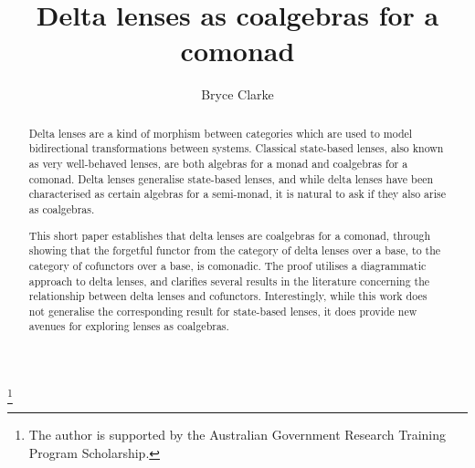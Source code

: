 \documentclass[colorlinks = true, a4paper, oneside, reqno, 11pt]{amsart}
\theoremstyle{definition}
\theoremstyle{remark}
\begin{document}
\title{Delta lenses as coalgebras for a comonad}

\author{Bryce Clarke}

\address{Centre of Australian Category Theory\\
Macquarie University, NSW 2109, Australia}


\thanks{The author is supported by the 
Australian Government Research Training Program Scholarship.}





\begin{abstract}
Delta lenses are a kind of morphism between categories which are 
used to model bidirectional transformations between systems. 
Classical state-based lenses, also known as very well-behaved lenses, 
are both algebras for a monad and coalgebras for a comonad. 
Delta lenses generalise state-based lenses, and while delta lenses 
have been characterised as certain algebras for a semi-monad, 
it is natural to ask if they also arise as coalgebras. 

This short paper establishes that delta lenses are coalgebras 
for a comonad, through showing that the forgetful functor 
from the category of delta lenses over a base, to the category 
of cofunctors over a base, is comonadic. 
The proof utilises a diagrammatic approach to delta lenses, 
and clarifies several results in the literature concerning the 
relationship between delta lenses and cofunctors. 
Interestingly, while this work does not generalise the 
corresponding result for state-based lenses, it does provide new 
avenues for exploring lenses as coalgebras. 
\end{abstract}

\maketitle

\end{document}
